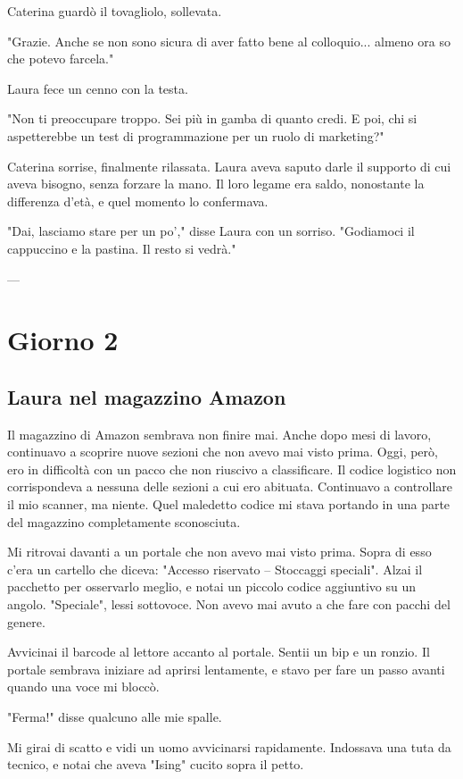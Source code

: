 Caterina guardò il tovagliolo, sollevata.

"Grazie. Anche se non sono sicura di aver fatto bene al colloquio... almeno ora so che potevo farcela."

Laura fece un cenno con la testa.

"Non ti preoccupare troppo. Sei più in gamba di quanto credi. E poi, chi si aspetterebbe un test di programmazione per un ruolo di marketing?"

Caterina sorrise, finalmente rilassata. Laura aveva saputo darle il supporto di cui aveva bisogno, senza forzare la mano. Il loro legame era saldo, nonostante la differenza d'età, e quel momento lo confermava.

"Dai, lasciamo stare per un po'," disse Laura con un sorriso. "Godiamoci il cappuccino e la pastina. Il resto si vedrà."

---

\section{Giorno 2}

\subsection{Laura nel magazzino Amazon}

Il magazzino di Amazon sembrava non finire mai. Anche dopo mesi di lavoro, continuavo a scoprire nuove sezioni che non avevo mai visto prima. Oggi, però, ero in difficoltà con un pacco che non riuscivo a classificare. Il codice logistico non corrispondeva a nessuna delle sezioni a cui ero abituata. Continuavo a controllare il mio scanner, ma niente. Quel maledetto codice mi stava portando in una parte del magazzino completamente sconosciuta.

Mi ritrovai davanti a un portale che non avevo mai visto prima. Sopra di esso c’era un cartello che diceva: "Accesso riservato – Stoccaggi speciali". Alzai il pacchetto per osservarlo meglio, e notai un piccolo codice aggiuntivo su un angolo. "Speciale", lessi sottovoce. Non avevo mai avuto a che fare con pacchi del genere.

Avvicinai il barcode al lettore accanto al portale. Sentii un bip e un ronzio. Il portale sembrava iniziare ad aprirsi lentamente, e stavo per fare un passo avanti quando una voce mi bloccò.

"Ferma!" disse qualcuno alle mie spalle.

Mi girai di scatto e vidi un uomo avvicinarsi rapidamente. Indossava una tuta da tecnico, e notai che aveva "Ising" cucito sopra il petto.

